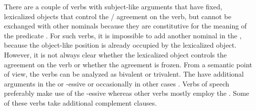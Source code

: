 There are a couple of verbs with  subject-like arguments that have fixed, lexicalized objects that control the / agreement on the verb, but cannot be exchanged with other nominals because they are constitutive for the meaning of the predicate . For such verbs, it is impossible to add another nominal in the , because the object-like position is already occupied by the lexicalized object. However, it is not always clear whether the lexicalized object controls the  agreement on the verb or whether the  agreement is frozen. From a semantic point of view, the verbs can be analyzed as bivalent or trivalent. The  have additional arguments in the   or -essive  or occasionally in other cases . Verbs of speech preferably make use of the -essive whereas other verbs mostly employ the . Some of these verbs take additional complement clauses.
%
